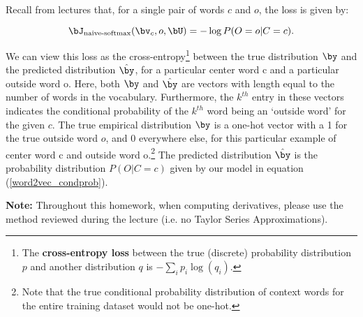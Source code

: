 Recall from lectures that, for a single pair of words $c$ and $o$, the loss is given by:

\begin{equation} 
\bJ_{\text{naive-softmax}}(\bv_c, o, \bU) = -\log P(O=o| C=c).
\label{naive-softmax}
\end{equation}

We can view this loss as the cross-entropy\footnote{The \textbf{cross-entropy loss} between the true (discrete) probability distribution $p$ and another distribution $q$ is $-\sum_i p_i \log(q_i)$.} between the true distribution $\by$ and the predicted distribution $\hat{\by}$, for a particular center word c and a particular outside word o. 
Here, both $\by$ and $\hat{\by}$ are vectors with length equal to the number of words in the vocabulary.
Furthermore, the $k^{th}$ entry in these vectors indicates the conditional probability of the $k^{th}$ word being an `outside word' for the given $c$. 
The true empirical distribution $\by$ is a one-hot vector with a 1 for the true outside word $o$, and 0 everywhere else, for this particular example of center word c and outside word o.\footnote{Note that the true conditional probability distribution of context words for the entire training dataset would not be one-hot.}
The predicted distribution $\hat{\by}$ is the probability distribution $P(O|C=c)$ given by our model in equation (\ref{word2vec_condprob}). \newline

\textbf{Note:} Throughout this homework, when computing derivatives, please use the method reviewed during the lecture (i.e. no Taylor Series Approximations).

